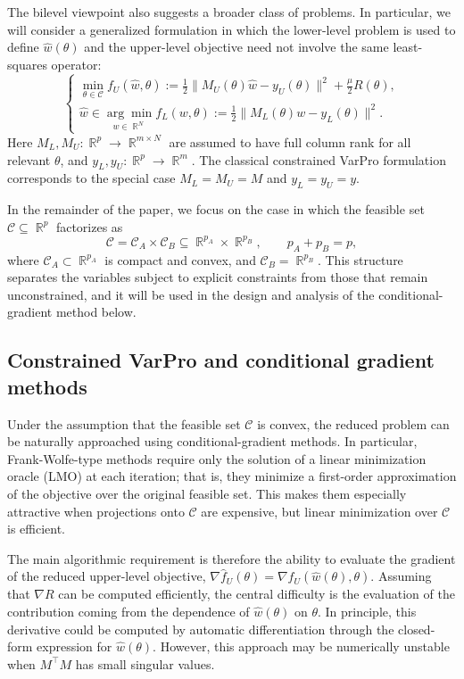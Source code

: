 \documentclass{article}
\DeclareMathOperator{\R}{\mathbb{R}}
\begin{document}
The bilevel viewpoint also suggests a broader class of problems. In particular, we will consider a generalized formulation in which the lower-level problem is used to define
$\widehat w(\theta)$ and the upper-level objective need not involve the same
least-squares operator:
\begin{equation}\label{eq:bilevel_general_formulation}
\begin{cases}
    \displaystyle
    \min_{\theta \in \mathcal C}
    f_U(\widehat w,\theta)
    :=
    \frac12 \|M_U(\theta)\widehat w-y_U(\theta)\|^2
    + \frac{\mu}{2}R(\theta),
    \\[0.8em]
    \displaystyle
    \widehat w
    \in
    \underset{w \in \R^N}{\arg\min}
    f_L(w,\theta)
    :=
    \frac12 \|M_L(\theta)w-y_L(\theta)\|^2.
\end{cases}
\end{equation}
Here $M_L,M_U:\R^p\to\R^{m\times N}$ are assumed to have full column rank for
all relevant $\theta$, and $y_L,y_U:\R^p\to\R^m$. The classical constrained
VarPro formulation corresponds to the special case
$M_L=M_U=M$ and $y_L=y_U=y$.

In the remainder of the paper, we focus on the case in which the feasible set $\mathcal C\subseteq\R^p$
factorizes as
\[
    \mathcal C = \mathcal C_A \times \mathcal C_B
    \subseteq \R^{p_A}\times\R^{p_B},
    \qquad
    p_A+p_B=p,
\]
where $\mathcal C_A\subset\R^{p_A}$ is compact and convex, and
$\mathcal C_B=\R^{p_B}$. This structure separates the variables subject to
explicit constraints from those that remain unconstrained, and it will be used
in the design and analysis of the conditional-gradient method below.


\subsection{Constrained VarPro and conditional gradient methods}

Under the assumption that the feasible set $\mathcal C$ is convex, the reduced problem can be naturally approached using conditional-gradient methods. In particular, Frank-Wolfe-type methods \cite{bomze2021frank,Frank1956-fg} require only the solution of a linear minimization oracle (LMO) at each iteration; that is, they minimize a first-order approximation of the objective over the original feasible set. This makes them especially attractive when projections onto $\mathcal C$ are expensive, but linear minimization over $\mathcal C$ is efficient.

The main algorithmic requirement is therefore the ability to evaluate the gradient of the reduced upper-level objective, $\nabla \widehat f_U(\theta) = \nabla f_U(\widehat w(\theta),\theta)$. Assuming that $\nabla R$ can be computed efficiently, the central difficulty is the evaluation of the contribution coming from the dependence of $\widehat w(\theta)$ on $\theta$. In principle, this derivative could be computed by automatic differentiation through the closed-form expression for $\widehat w(\theta)$. However, this approach may be numerically unstable when $M^\top M$ has small singular values.
\end{document}

